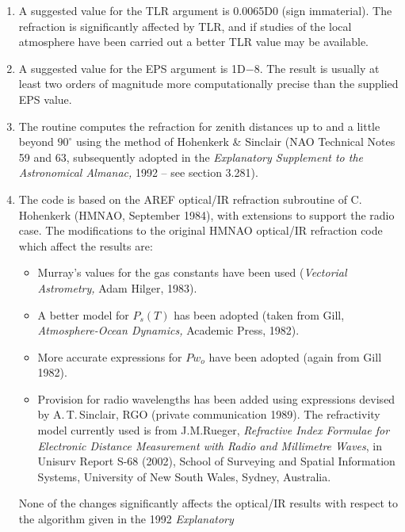 \documentclass[11pt,twoside]{article}
\begin{document}
{
 \begin{enumerate}
  \item A suggested value for the TLR argument is 0.0065D0 (sign immaterial).
        The refraction is significantly affected by TLR, and if studies
        of the local atmosphere have been carried out a better TLR
        value may be available.
  \item A suggested value for the EPS argument is 1D$-$8.  The result is
        usually at least two orders of magnitude more computationally
        precise than the supplied EPS value.
  \item The routine computes the refraction for zenith distances up
        to and a little beyond $90^\circ$ using the method of Hohenkerk
        \& Sinclair (NAO Technical Notes 59 and 63, subsequently adopted
        in the {\it Explanatory Supplement to the Astronomical Almanac,}\/
        1992 -- see section 3.281).
  \item The code is based on the AREF optical/IR refraction subroutine
        of C.\,Hohenkerk (HMNAO, September 1984), with extensions to
        support the radio case.  The modifications to the original HMNAO
        optical/IR refraction code which affect the results are:
        \begin{itemize}
         \item Murray's values for the gas constants have been used
               ({\it Vectorial Astrometry,}\/ Adam Hilger, 1983).
         \item A better model for $P_s(T)$ has been adopted (taken from
               Gill, {\it Atmosphere-Ocean Dynamics,}\/ Academic Press, 1982).
         \item More accurate expressions for $Pw_o$ have been adopted
               (again from Gill 1982).
         \item Provision for radio wavelengths has been added using
               expressions devised by A.\,T.\,Sinclair, RGO (private
               communication 1989).  The refractivity model currently
               used is from J.M.Rueger, {\it Refractive Index Formulae for
               Electronic Distance Measurement with Radio and Millimetre
               Waves}, in Unisurv Report S-68 (2002), School of Surveying
               and Spatial Information Systems, University of New South
               Wales, Sydney, Australia.
        \end{itemize}
        None of the changes significantly affects the optical/IR results
        with respect to the algorithm given in the 1992 {\it Explanatory
}
\end{enumerate}}
\end{document}
